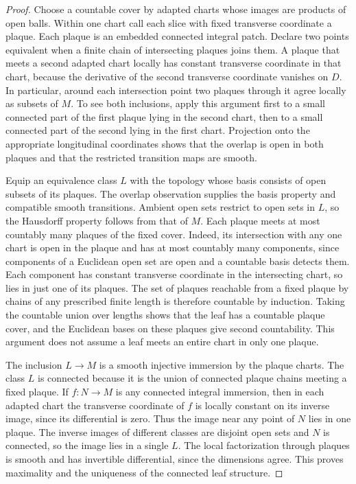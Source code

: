\documentclass[11pt,oneside,openany]{book}
\theoremstyle{definition}
\theoremstyle{remark}
\begin{document}
\begin{proof}
Choose a countable cover by adapted charts whose images are products of open balls. Within one chart call each slice with fixed transverse coordinate a plaque. Each plaque is an embedded connected integral patch. Declare two points equivalent when a finite chain of intersecting plaques joins them. A plaque that meets a second adapted chart locally has constant transverse coordinate in that chart, because the derivative of the second transverse coordinate vanishes on \(D\). In particular, around each intersection point two plaques through it agree locally as subsets of \(M\). To see both inclusions, apply this argument first to a small connected part of the first plaque lying in the second chart, then to a small connected part of the second lying in the first chart. Projection onto the appropriate longitudinal coordinates shows that the overlap is open in both plaques and that the restricted transition maps are smooth.

Equip an equivalence class \(L\) with the topology whose basis consists of open subsets of its plaques. The overlap observation supplies the basis property and compatible smooth transitions. Ambient open sets restrict to open sets in \(L\), so the Hausdorff property follows from that of \(M\). Each plaque meets at most countably many plaques of the fixed cover. Indeed, its intersection with any one chart is open in the plaque and has at most countably many components, since components of a Euclidean open set are open and a countable basis detects them. Each component has constant transverse coordinate in the intersecting chart, so lies in just one of its plaques. The set of plaques reachable from a fixed plaque by chains of any prescribed finite length is therefore countable by induction. Taking the countable union over lengths shows that the leaf has a countable plaque cover, and the Euclidean bases on these plaques give second countability. This argument does not assume a leaf meets an entire chart in only one plaque.

The inclusion \(L\to M\) is a smooth injective immersion by the plaque charts. The class \(L\) is connected because it is the union of connected plaque chains meeting a fixed plaque. If \(f:N\to M\) is any connected integral immersion, then in each adapted chart the transverse coordinate of \(f\) is locally constant on its inverse image, since its differential is zero. Thus the image near any point of \(N\) lies in one plaque. The inverse images of different classes are disjoint open sets and \(N\) is connected, so the image lies in a single \(L\). The local factorization through plaques is smooth and has invertible differential, since the dimensions agree. This proves maximality and the uniqueness of the connected leaf structure.
\end{proof}
\end{document}
